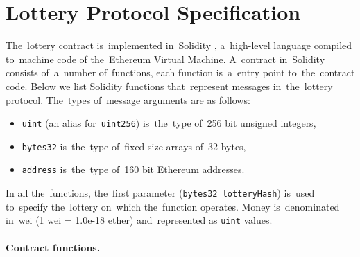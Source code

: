 \documentclass[a4paper]{article}
\begin{document}
\section{Lottery Protocol Specification}
\label{sec:lottery-protocol}
    The~lottery contract is~implemented in~Solidity \cite{SOLIDITY}, a~high-level language compiled to~machine code of
    the~Ethereum Virtual Machine\cite{ETHERDEV}. A~contract in~Solidity consists of~a~number of~functions, each
    function is~a~entry point to~the~contract code. Below we list Solidity functions that~represent messages
    in~the~lottery protocol. The~types of~message arguments are as follows:
    \begin{itemize}
        \item \texttt{uint} (an alias for~\texttt{uint256}) is~the~type of~256 bit unsigned integers,
        \item \texttt{bytes32} is~the~type of~fixed-size arrays of~32 bytes,
        \item \texttt{address} is~the~type of~160 bit Ethereum addresses.
    \end{itemize}
    In all the~functions, the~first parameter (\texttt{bytes32 lotteryHash}) is~used to~specify the~lottery on~which
    the~function operates. Money is~denominated in~wei (1 wei = 1.0e-18 ether) and~represented as \texttt{uint} values.

    \paragraph{Contract functions.}
\end{document}
